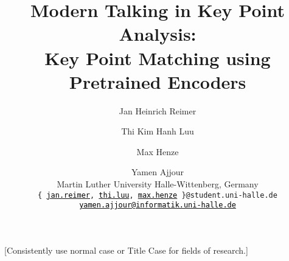 \documentclass[11pt]{article}
\title{%
  Modern Talking in Key Point Analysis: \\
  Key Point Matching using Pretrained Encoders%
}
\author{%
  Jan Heinrich Reimer \and Thi Kim Hanh Luu \and Max Henze \and Yamen Ajjour \\
  Martin Luther University Halle-Wittenberg, Germany \\ 
  \texttt{\{%
  \href{mailto:jan.reimer@student.uni-halle.de}{\textcolor{black}{jan.reimer}},%
  \href{mailto:thi.luu@student.uni-halle.de}{\textcolor{black}{thi.luu}},%
  \href{mailto:max.henze@student.uni-halle.de}{\textcolor{black}{max.henze}}%
  \}@student.uni-halle.de} \\ 
  \texttt{\href{mailto:yamen.ajjour@informatik.uni-halle.de}{\textcolor{black}{yamen.ajjour@informatik.uni-halle.de}}}%
}
\newcommand{\todo}[1]{{\smaller\color{red}[#1]}}
\begin{document}
\maketitle

\begin{abstract}
  
\end{abstract}












\appendix



\todo{Consistently use normal case or Title Case for fields of research.}
\end{document}
